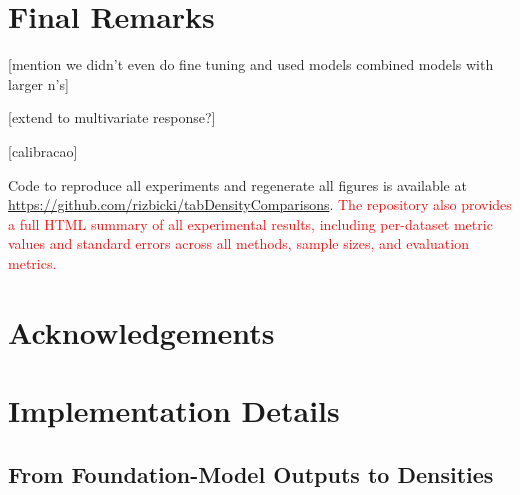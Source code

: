 \documentclass{article}
\begin{document}
\section{Final Remarks}
\label{sec:final}

[mention we didn't even do fine tuning and used models combined models with larger n's]

[extend to multivariate response?]

[calibracao]

Code to reproduce all experiments and regenerate all figures is available
at \url{https://github.com/rizbicki/tabDensityComparisons}. \textcolor{red}{The repository also provides a full HTML summary of all experimental results, including per-dataset metric values and standard errors across all methods, sample sizes, and evaluation metrics.}


\section*{Acknowledgements}







\appendix



\section{Implementation Details}
\label{app:implementation}

\subsection{From Foundation-Model Outputs to Densities}
\label{app:tfm_details}
\end{document}
